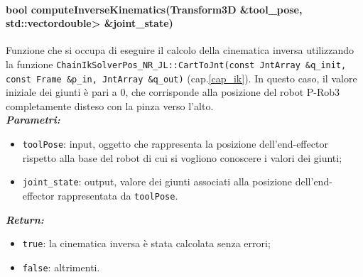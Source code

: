 \paragraph{bool computeInverseKinematics(Transform3D \&tool\_pose, std::vector\tl double\tr> \&joint\_state)}
Funzione che si occupa di eseguire il calcolo della cinematica inversa utilizzando la funzione \texttt{ChainIkSolverPos\_NR\_JL::CartToJnt(const JntArray \&q\_init, const Frame \&p\_in, JntArray \&q\_out)} (cap.\ref{cap_ik}). In questo caso, il valore iniziale dei giunti è pari a 0, che corrisponde alla posizione del robot P-Rob3 completamente disteso con la pinza verso l'alto.\\
\textbf{\textit{Parametri:}}
\begin{itemize}
	\item \texttt{toolPose}: input, oggetto che rappresenta la posizione dell'end-effector rispetto alla base del robot di cui si vogliono conoscere i valori dei giunti;
	\item \texttt{joint\_state}: output, valore dei giunti associati alla posizione dell'end-effector rappresentata da \texttt{toolPose}.
\end{itemize}
\textbf{\textit{Return:}}
\begin{itemize}
	\item \texttt{true}: la cinematica inversa è stata calcolata senza errori;
	\item \texttt{false}: altrimenti.
\end{itemize}

